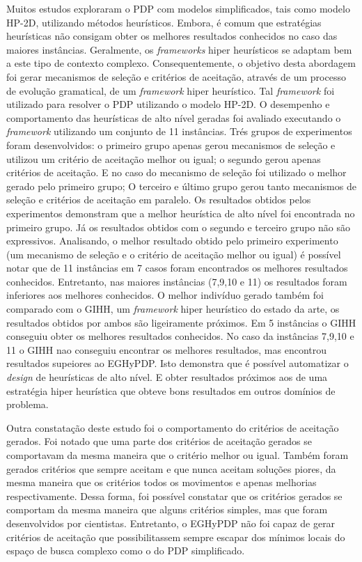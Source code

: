 		Muitos estudos exploraram o PDP com modelos simplificados, tais como modelo HP-2D, utilizando métodos heurísticos. Embora, é comum que estratégias heurísticas não consigam obter os melhores resultados conhecidos no caso das maiores instâncias. Geralmente, os \textit{frameworks} hiper heurísticos se adaptam bem a este tipo de contexto complexo. Consequentemente, o objetivo desta abordagem foi gerar mecanismos de seleção e critérios de aceitação, através de um processo de evolução gramatical, de um \textit{framework} hiper heurístico. Tal \textit{framework} foi utilizado para resolver o PDP utilizando o modelo HP-2D. O desempenho e comportamento das heurísticas de alto nível geradas foi avaliado executando o \textit{framework} utilizando um conjunto de 11 instâncias. 
		Trés grupos de experimentos foram desenvolvidos: o primeiro grupo apenas gerou mecanismos de seleção e utilizou um critério de aceitação melhor ou igual; o segundo gerou apenas critérios de aceitação. E no caso do mecanismo de seleção foi utilizado o melhor gerado pelo primeiro grupo; O terceiro e último grupo gerou tanto mecanismos de seleção e critérios de aceitação em paralelo. Os resultados obtidos pelos experimentos demonstram que a melhor heurística de alto nível foi encontrada no primeiro grupo. Já os resultados obtidos com o segundo e terceiro grupo não são expressivos. Analisando, o melhor resultado obtido pelo primeiro experimento (um mecanismo de seleção e o critério de aceitação melhor ou igual) é possível notar que de 11 instâncias em 7 casos foram encontrados os melhores resultados conhecidos. Entretanto, nas maiores instâncias (7,9,10 e 11) os resultados foram inferiores aos melhores conhecidos. 
		O melhor indivíduo gerado também foi comparado com o GIHH, um \textit{framework} hiper heurístico do estado da arte, os resultados obtidos por ambos são ligeiramente próximos. Em 5 instâncias o GIHH conseguiu obter os melhores resultados conhecidos. No caso da instâncias 7,9,10 e 11 o GIHH nao conseguiu encontrar os melhores resultados, mas encontrou resultados supeiores ao EGHyPDP. Isto demonstra que é possível automatizar o \textit{design} de heurísticas de alto nível. E obter resultados próximos aos de uma estratégia hiper heurística que obteve bons resultados em outros domínios de problema.
		
		Outra constatação deste estudo foi o comportamento do critérios de aceitação gerados. Foi notado que uma parte dos critérios de aceitação gerados se comportavam da mesma maneira que o critério melhor ou igual. Também foram gerados critérios que sempre aceitam e que nunca aceitam soluções piores, da mesma maneira que os critérios todos os movimentos e apenas melhorias respectivamente. Dessa forma, foi possível constatar que os critérios gerados se comportam da mesma maneira que alguns critérios simples, mas que foram desenvolvidos por cientistas. Entretanto, o EGHyPDP não foi capaz de gerar critérios de aceitação que possibilitassem sempre escapar dos mínimos locais do espaço de busca complexo como o do PDP simplificado.

	
	
